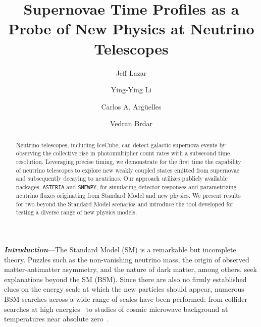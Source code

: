 \documentclass[aps,twocolumn,prl,showpacs,showkeys,preprintnumbers,superscriptaddress,nobibnotes,floatfix,longbibliography,notitlepage,nofootinbib]{revtex4-2}
\begin{document}

\title{
Supernovae Time Profiles as a Probe of New Physics at Neutrino Telescopes
}

\author{Jeff Lazar}
\author{Ying-Ying Li}
\author{Carlos A. Arg\"{u}elles}
\author{Vedran Brdar}


\begin{abstract}
Neutrino telescopes, including IceCube, can detect galactic supernova events by observing the collective rise in photomultiplier count rates with a subsecond time resolution. 
Leveraging precise timing, we demonstrate for the first time the capability of neutrino telescopes to explore new weakly coupled states emitted from supernovae and subsequently decaying to neutrinos.
Our approach utilizes publicly available packages, \texttt{ASTERIA} and \texttt{SNEWPY}, for simulating detector responses and parametrizing neutrino fluxes originating from Standard Model and new physics. 
We present results for two beyond the Standard Model scenarios and introduce the tool developed for testing a diverse range of new physics models.
\end{abstract}

\maketitle

\textbf{\textit{Introduction}}---The Standard Model (SM) is a remarkable but incomplete theory. 
Puzzles such as the non-vanishing neutrino mass, the origin of observed matter-antimatter asymmetry, and the nature of dark matter, among others, seek explanations beyond the SM (BSM).
Since there are also no firmly established clues on the energy scale at which the new particles should appear, numerous BSM searches across a wide range of scales have been performed: from collider searches at high energies~\cite{Nath:2010zj} to studies of cosmic microwave background at temperatures near absolute zero~\cite{Baumann:2015rya}.
\end{document}
